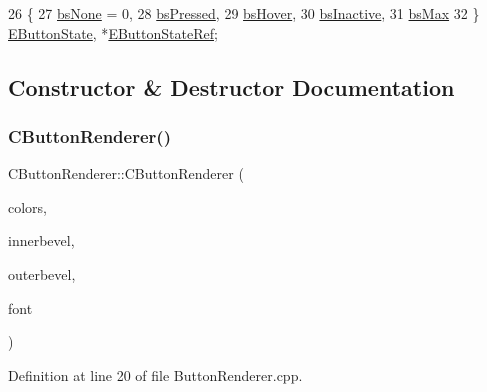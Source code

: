 \begin{DoxyCode}
26                     \{
27             \hyperlink{classCButtonRenderer_ae0eccda184600f6e14bfd59033e5e9a1aa0cd7277705307bef6c50f2250b5d62d}{bsNone} = 0,
28             \hyperlink{classCButtonRenderer_ae0eccda184600f6e14bfd59033e5e9a1a8fad69630f3700a97a0c51bcbb4441b5}{bsPressed},
29             \hyperlink{classCButtonRenderer_ae0eccda184600f6e14bfd59033e5e9a1ad6758a415bde0eee152a0e2f7d07e3b6}{bsHover},
30             \hyperlink{classCButtonRenderer_ae0eccda184600f6e14bfd59033e5e9a1a982d739b5c4b45ebf0b20a4c205a3531}{bsInactive},
31             \hyperlink{classCButtonRenderer_ae0eccda184600f6e14bfd59033e5e9a1aa674e22146de8dfe27c5c1ad64f3e1bd}{bsMax}
32         \} \hyperlink{classCButtonRenderer_ae0eccda184600f6e14bfd59033e5e9a1}{EButtonState}, *\hyperlink{classCButtonRenderer_a402e6dc71de924ff3daf036e31048ce7}{EButtonStateRef};
\end{DoxyCode}


\subsection{Constructor \& Destructor Documentation}
\hypertarget{classCButtonRenderer_a168e60a1e237820d58b4667003340aaf}{}\label{classCButtonRenderer_a168e60a1e237820d58b4667003340aaf} 
\subsubsection{\texorpdfstring{C\+Button\+Renderer()}{CButtonRenderer()}}
{\footnotesize\ttfamily C\+Button\+Renderer\+::\+C\+Button\+Renderer (\begin{DoxyParamCaption}\item[{std\+::shared\+\_\+ptr$<$ \hyperlink{classCGraphicTileset}{C\+Graphic\+Tileset} $>$}]{colors,  }\item[{std\+::shared\+\_\+ptr$<$ \hyperlink{classCBevel}{C\+Bevel} $>$}]{innerbevel,  }\item[{std\+::shared\+\_\+ptr$<$ \hyperlink{classCBevel}{C\+Bevel} $>$}]{outerbevel,  }\item[{std\+::shared\+\_\+ptr$<$ \hyperlink{classCFontTileset}{C\+Font\+Tileset} $>$}]{font }\end{DoxyParamCaption})}



Definition at line 20 of file Button\+Renderer.\+cpp.


